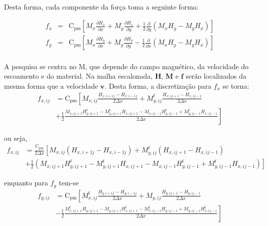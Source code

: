 \documentclass[eletromagnetismo.tex]{subfiles}
\begin{document}
\paragraph{} Desta forma, cada componente da força toma a seguinte forma:

\begin{eqnarray}
f_x & = & \mathrm{C}_{\mathrm{pm}}\left[M_x \frac{\partial H_x}{\partial x}+M_y \frac{\partial H_x}{\partial y}+\frac{1}{2}\frac{\partial}{\partial y}(M_x H_y - M_y H_x)\right]\\
f_y & = & \mathrm{C}_{\mathrm{pm}}\left[M_x \frac{\partial H_y}{\partial x}+M_y \frac{\partial H_y}{\partial y}-\frac{1}{2}\frac{\partial}{\partial x}(M_x H_y - M_y H_x)\right]
\end{eqnarray}

\paragraph{} A pesquisa se centra no $\mathrm{M}$, que depende do campo magnético, da velocidade do escoamento e do material. Na malha escalonada, $\mathbf{H}$, $\mathbf{M}$ e $\mathbf{f}$ serão localizados da mesma forma que a velocidade $\mathbf{v}$. Desta forma, a discretização para $f_x$ se torna: \begin{align}
f_{x,ij} & = \mathrm{C}_{\mathrm{pm}}\left[M_{x,ij} \frac{H_{x,i+1j} - H_{x,i-1j}}{2\Delta x}+M_{y,ij}^t \frac{H_{x,ij+1} - H_{x,ij-1}}{2\Delta x} \right. \nonumber \\
&+\left. \frac{1}{2}\frac{M_{x,ij+1} H_{y,ij+1}^t - M_{y,ij+1}^t H_{x,ij+1} - M_{x,ij-1} H_{y,ij-1}^t + M_{y,ij-1}^t H_{x,ij-1}}{2\Delta x}\right]
\end{align}

ou seja,
 \begin{align}
f_{x,ij} & = \frac{\mathrm{C}_{\mathrm{pm}}}{2\Delta x}\left[M_{x,ij} (H_{x,i+1j} - H_{x,i-1j})+M_{y,ij}^t (H_{x,ij+1} - H_{x,ij-1})\right. \nonumber \\
&+\left. \tfrac{1}{2}(M_{x,ij+1} H_{y,ij+1}^t - M_{y,ij+1}^t H_{x,ij+1} - M_{x,ij-1} H_{y,ij-1}^t + M_{y,ij-1}^t H_{x,ij-1})\right]
\end{align}

enquanto para $f_y$ tem-se \begin{align}
f_{y,ij} & = \mathrm{C}_{\mathrm{pm}}\left[M_{x,ij}^t \frac{H_{y,i+1j} - H_{y,i-1j}}{2\Delta x}+M_{y,ij} \frac{H_{y,ij+1} - H_{y,ij-1}}{2\Delta x} \right. \nonumber \\
&-\left. \frac{1}{2}\frac{M_{x,ij+1}^t H_{y,ij+1} - M_{y,ij+1} H_{x,ij+1}^t - M_{x,ij-1}^t H_{y,ij-1} + M_{y,ij-1} H_{x,ij-1}^t}{2\Delta x}\right]
\end{align}
\end{document}
